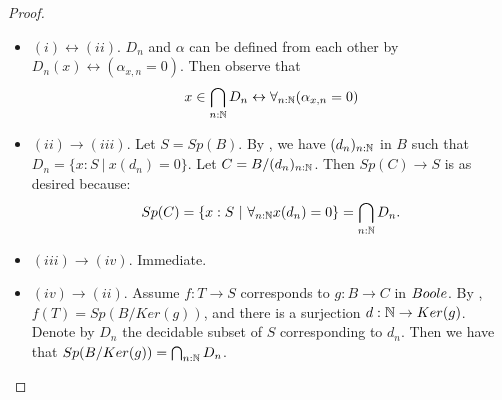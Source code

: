 \begin{proof}
\item 
  \begin{itemize}
  \item 
    $(i)\leftrightarrow (ii)$. $D_n$ and $\alpha$ can be defined from each other by 
     $D_n(x) \leftrightarrow (\alpha_{x,n} = 0)$. Then observe that
     \[
     x\in \bigcap_{n:\mathbb{N}} D_n \leftrightarrow 
      \forall_{n:\mathbb N} (\alpha_{x,n} = 0) 
     \]
     
   \item $(ii) \to (iii)$. Let $S=Sp(B)$. 
      By , we have $(d_n)_{n:\mathbb{N}}$ in $B$ such that $D_n = \{x:S\ |\ x(d_n) = 0\}$. 
      Let $C = B/(d_n)_{n:\mathbb{N}}$.
      Then $Sp(C) \to S$ is as desired because:
      \[Sp(C) = \{x:S\ |\ \forall_{n:\N} x(d_n) =0\}  = \bigcap_{n:\N} D_n.\]
   \item $(iii) \to (iv)$. Immediate.
   \item $(iv) \to (ii)$. Assume $f:T\to S$ corresponds to $g:B\to C$ in $\Boole$. 
     By , $f(T) = Sp(B/Ker(g))$, and 
     there is a surjection $d:\mathbb{N}\to Ker(g)$. Denote by $D_n$ the decidable subset of $S$ corresponding to $d_n$. Then we have that $Sp(B/Ker(g)) = \bigcap_{n:\mathbb{N}} D_n$. 
%

\end{itemize}
\end{proof}
